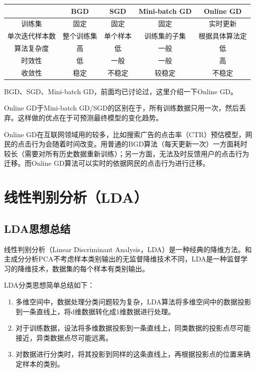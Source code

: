 \begin{table}[h]
	\centering
	\begin{tabular}{|c|c|c|c|c|} \hline
	& BGD & SGD & Mini-batch GD & Online GD \\\hline
	训练集 & 固定 & 固定 & 固定 & 实时更新 \\\hline
	单次迭代样本数 & 整个训练集 & 单个样本 & 训练集的子集 & 根据具体算法定 \\\hline
	算法复杂度 & 高 & 低 & 一般 & 低  \\\hline
	时效性 & 低 & 一般 & 一般 & 高 \\\hline
	收敛性 & 稳定 & 不稳定 & 较稳定 & 不稳定 \\\hline
	\end{tabular}
\end{table}

BGD、SGD、Mini-batch GD，前面均已讨论过，这里介绍一下Online GD。

Online GD于Mini-batch GD/SGD的区别在于，所有训练数据只用一次，然后丢弃。这样做的优点在于可预测最终模型的变化趋势。

Online GD在互联网领域用的较多，比如搜索广告的点击率（CTR）预估模型，网民的点击行为会随着时间改变。用普通的BGD算法（每天更新一次）一方面耗时较长（需要对所有历史数据重新训练）；另一方面，无法及时反馈用户的点击行为迁移。而Online GD算法可以实时的依据网民的点击行为进行迁移。

\section{线性判别分析（LDA）}

\subsection{LDA思想总结}

线性判别分析（Linear Discriminant Analysis，LDA）是一种经典的降维方法。和主成分分析PCA不考虑样本类别输出的无监督降维技术不同，LDA是一种监督学习的降维技术，数据集的每个样本有类别输出。

LDA分类思想简单总结如下：

\begin{enumerate}
\itemsep0em
\item 多维空间中，数据处理分类问题较为复杂，LDA算法将多维空间中的数据投影到一条直线上，将d维数据转化成1维数据进行处理。
\item 对于训练数据，设法将多维数据投影到一条直线上，同类数据的投影点尽可能接近，异类数据点尽可能远离。
\item 对数据进行分类时，将其投影到同样的这条直线上，再根据投影点的位置来确定样本的类别。
\end{enumerate}


